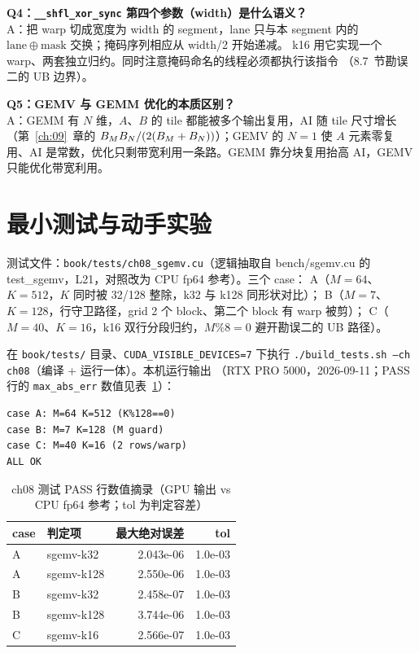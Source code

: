\textbf{Q4：\texttt{\_\allowbreak{}\_\allowbreak{}shfl\_\allowbreak{}xor\_\allowbreak{}sync} 第四个参数（width）是什么语义？}\\
A：把 warp 切成宽度为 width 的 segment，lane 只与本 segment 内的
$\mathrm{lane} \oplus \mathrm{mask}$ 交换；掩码序列相应从 width/2 开始递减。
k16 用它实现一个 warp、两套独立归约。同时注意掩码命名的线程必须都执行该指令
（8.7~节勘误二的 UB 边界）。

\textbf{Q5：GEMV 与 GEMM 优化的本质区别？}\\
A：GEMM 有 $N$ 维，$A$、$B$ 的 tile 都能被多个输出复用，AI 随 tile 尺寸增长
（第~\ref{ch:09}~章的 $B\sb{M}B\sb{N}/(2(B\sb{M}+B\sb{N}))$）；GEMV 的 $N=1$ 使
$A$ 元素零复用、AI 是常数，优化只剩带宽利用一条路。GEMM 靠分块复用抬高 AI，GEMV 只能优化带宽利用。

\section{最小测试与动手实验}

测试文件：\texttt{book/\allowbreak{}tests/\allowbreak{}ch08\_\allowbreak{}sgemv.\allowbreak{}cu}（逻辑抽取自 bench/sgemv.cu 的
test\_sgemv，L21，对照改为 CPU fp64 参考）。三个 case：
A（$M{=}64$、$K{=}512$，$K$ 同时被 32/128 整除，k32 与 k128 同形状对比）；
B（$M{=}7$、$K{=}128$，行守卫路径，grid 2 个 block、第二个 block 有 warp 被剪）；
C（$M{=}40$、$K{=}16$，k16 双行分段归约，$M \% 8 = 0$ 避开勘误二的 UB 路径）。

在 \texttt{book/tests/} 目录、\texttt{CUDA\_\allowbreak{}VISIBLE\_\allowbreak{}DEVICES=\allowbreak{}7} 下执行
\texttt{.\allowbreak{}/\allowbreak{}build\_\allowbreak{}tests.\allowbreak{}sh --ch ch08}（编译 + 运行一体）。本机运行输出
（RTX PRO 5000，2026-09-11；PASS 行的 \texttt{max\_abs\_err} 数值见表~\ref{tab:8-pass}）：

\begin{lstlisting}[style=console]
case A: M=64 K=512 (K%128==0)
case B: M=7 K=128 (M guard)
case C: M=40 K=16 (2 rows/warp)
ALL OK
\end{lstlisting}

\begin{table}[htbp]
\centering
\caption{ch08 测试 PASS 行数值摘录（GPU 输出 vs CPU fp64 参考；tol 为判定容差）}
\label{tab:8-pass}
\begin{tabular}{llrr}
\toprule
case & 判定项 & 最大绝对误差 & tol \\
\midrule
A & sgemv-k32  & 2.043e-06 & 1.0e-03 \\
A & sgemv-k128 & 2.550e-06 & 1.0e-03 \\
B & sgemv-k32  & 2.458e-07 & 1.0e-03 \\
B & sgemv-k128 & 3.744e-06 & 1.0e-03 \\
C & sgemv-k16  & 2.566e-07 & 1.0e-03 \\
\bottomrule
\end{tabular}
\end{table}

